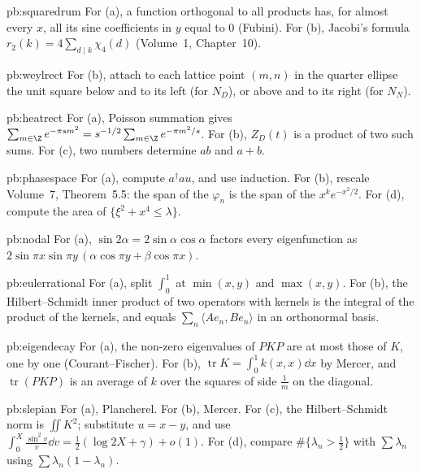 \begin{hint}{pb:squaredrum}
For (a), a function orthogonal to all products has, for almost every $x$, all its sine coefficients in $y$ equal to $0$ (Fubini). For (b), Jacobi's formula $r_2(k)=4\sum_{d\mid k}\chi_4(d)$
(Volume~1, Chapter~10).
\end{hint}

\begin{hint}{pb:weylrect}
For (b), attach to each lattice point $(m,n)$ in the quarter ellipse the unit square below and to its left (for $N_D$), or above and to its right (for $N_N$).
\end{hint}

\begin{hint}{pb:heatrect}
For (a), Poisson summation gives $\sum_{m\in\Z}e^{-\pi sm^2}=s^{-1/2}\sum_{m\in\Z}e^{-\pi m^2/s}$. For (b), $Z_D(t)$ is a product of two such sums. For (c), two numbers determine
$ab$ and $a+b$.
\end{hint}

\begin{hint}{pb:phasespace}
For (a), compute $a^\dagger au$, and use induction. For (b), rescale Volume~7, Theorem~5.5: the span of the $\varphi_n$ is the span of the $x^ke^{-x^2/2}$. For (d), compute the area of
$\{\xi^2+x^4\le\lambda\}$.
\end{hint}

\begin{hint}{pb:nodal}
For (a), $\sin2\alpha=2\sin\alpha\cos\alpha$ factors every eigenfunction as $2\sin\pi x\sin\pi y\,(\alpha\cos\pi y+\beta\cos\pi x)$.
\end{hint}

\begin{hint}{pb:eulerrational}
For (a), split $\int_0^1$ at $\min(x,y)$ and $\max(x,y)$. For (b), the Hilbert--Schmidt inner product of two operators with kernels is the integral of the product of the kernels, and
equals $\sum_n\langle Ae_n,Be_n\rangle$ in an orthonormal basis.
\end{hint}

\begin{hint}{pb:eigendecay}
For (a), the non-zero eigenvalues of $PKP$ are at most those of $K$, one by one (Courant--Fischer). For (b), $\operatorname{tr}K=\int_0^1k(x,x)\dd x$ by Mercer, and $\operatorname{tr}(PKP)$ is an
average of $k$ over the squares of side $\frac1m$ on the diagonal.
\end{hint}

\begin{hint}{pb:slepian}
For (a), Plancherel. For (b), Mercer. For (c), the Hilbert--Schmidt norm is $\iint K^2$; substitute $u=x-y$, and use $\int_0^X\frac{\sin^2v}v\dd v=\frac12(\log2X+\gamma)+o(1)$. For (d), compare
$\#\{\lambda_n>\frac12\}$ with $\sum\lambda_n$ using $\sum\lambda_n(1-\lambda_n)$.
\end{hint}

